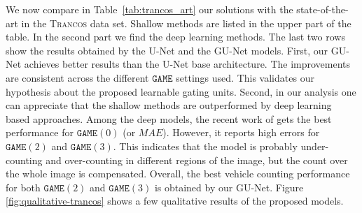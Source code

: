 \documentclass{bmvc2k}
\begin{document}
We now compare in Table~\ref{tab:trancos_art} our solutions with the state-of-the-art in the \textsc{Trancos} data set. Shallow methods are listed in the upper part of the table. In the second part we find the deep learning methods. The last two rows show the results obtained by the U-Net and the GU-Net models. First, our GU-Net achieves better results than the U-Net base architecture. The improvements are consistent across the different $\mathtt{GAME}$ settings used. This validates our hypothesis about the proposed learnable gating units. Second, in our analysis one can appreciate that the shallow methods are outperformed by deep learning based approaches. Among the deep models, the recent work of \cite{yuhong2018_csrnet} gets the best performance for $\mathtt{GAME}(0)$ (or $MAE$). However, it reports high errors for $\mathtt{GAME}(2)$ and $\mathtt{GAME}(3)$. This indicates that the model is probably under-counting and over-counting in different regions of the image, but the count over the whole image is compensated. Overall, the best vehicle counting performance for both $\mathtt{GAME}(2)$ and $\mathtt{GAME}(3)$ is obtained by our GU-Net. Figure \ref{fig:qualitative-trancos} shows a few qualitative results of the proposed models.
\end{document}
